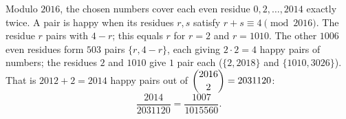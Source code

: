 Modulo $2016$, the chosen numbers cover each even residue $0,2,\dots,2014$ exactly twice. A pair is happy when its residues $r,s$ satisfy $r+s\equiv4\pmod{2016}$. The residue $r$ pairs with $4-r$; this equals $r$ for $r=2$ and $r=1010$. The other $1006$ even residues form $503$ pairs $\{r,4-r\}$, each giving $2\cdot2=4$ happy pairs of numbers; the residues $2$ and $1010$ give $1$ pair each ($\{2,2018\}$ and $\{1010,3026\}$). That is $2012+2=2014$ happy pairs out of $\dbinom{2016}{2}=2031120$:
\[\dfrac{2014}{2031120}=\boxed{\dfrac{1007}{1015560}}.\]
